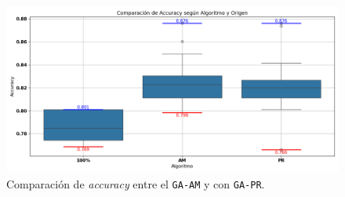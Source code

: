 \begin{figure}[htp]
  \centering
  \includegraphics[width=1\textwidth]{imagenes/evaluaciones/reinicio-poblacional.png}
  \caption{Comparación de \textit{accuracy} entre el \texttt{GA-AM} y con \texttt{GA-PR}.}
  \label{fig:reinicio_poblacional}
\end{figure}
